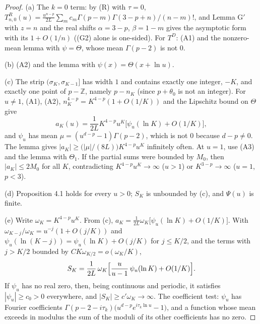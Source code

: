 \documentclass[11pt]{article}
\begin{document}
\begin{proof}
(a) The $k=0$ term: by (R) with $\tau=0$, $T^R_{n,0}(u)=\frac{u^{n-p}}{2L}\sum_mc_m\Gamma(p-m)\Gamma(3-p+n)/(n-m)!$, and Lemma G$'$ with $z=n$ and the real shifts $\alpha=3-p$, $\beta=1-m$ gives the asymptotic form with its $1+O(1/n)$ ((G2) alone is one-sided). For $T^D$: (A1) and the nonzero-mean lemma with $\psi=\Theta$, whose mean $\Gamma(p-2)$ is not $0$.

(b) (A2) and the lemma with $\psi(x)=\Theta(x+\ln u)$.

(c) The strip $(\sigma_K,\sigma_{K-1}]$ has width $1$ and contains exactly one integer, $-K$, and exactly one point of $p-\mathbb{Z}$, namely $p-n_K$ (since $p+\theta_0$ is not an integer). For $u\ne1$, (A1), (A2), $n_K^{4-p}=K^{4-p}(1+O(1/K))$ and the Lipschitz bound on $\Theta$ give
\[
a_K(u)=\frac{1}{2L}K^{4-p}u^K\bigl[\psi_u(\ln K)+O(1/K)\bigr],
\]
and $\psi_u$ has mean $\mu=(u^{d-p}-1)\Gamma(p-2)$, which is not $0$ because $d-p\ne0$. The lemma gives $|a_K|\ge\bigl(|\mu|/(8L)\bigr)K^{4-p}u^K$ infinitely often. At $u=1$, use (A3) and the lemma with $\Theta_1$. If the partial sums were bounded by $M_0$, then $|a_K|\le2M_0$ for all $K$, contradicting $K^{4-p}u^K\to\infty$ ($u>1$) or $K^{3-p}\to\infty$ ($u=1$, $p<3$).

(d) Proposition 4.1 holds for every $u>0$; $S_K$ is unbounded by (c), and $\Psi(u)$ is finite.

(e) Write $\omega_K=K^{4-p}u^K$. From (c), $a_K=\frac{1}{2L}\omega_K\bigl[\psi_u(\ln K)+O(1/K)\bigr]$. With $\omega_{K-j}/\omega_K=u^{-j}(1+O(j/K))$ and $\psi_u(\ln(K-j))=\psi_u(\ln K)+O(j/K)$ for $j\le K/2$, and the terms with $j>K/2$ bounded by $CK\omega_{K/2}=o(\omega_K/K)$,
\[
S_K=\frac{1}{2L}\,\omega_K\Bigl[\frac{u}{u-1}\,\psi_u(\ln K)+O(1/K)\Bigr].
\]
If $\psi_u$ has no real zero, then, being continuous and periodic, it satisfies $|\psi_u|\ge c_0>0$ everywhere, and $|S_K|\ge c'\omega_K\to\infty$. The coefficient test: $\psi_u$ has Fourier coefficients $\Gamma(p-2-i\tau_k)\bigl(u^{d-p}e^{i\tau_k\ln u}-1\bigr)$, and a function whose mean exceeds in modulus the sum of the moduli of its other coefficients has no zero.
\end{proof}
\end{document}

